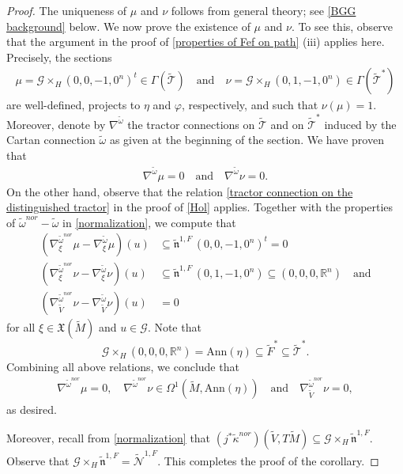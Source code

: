\documentclass[11pt]{amsart}
\begin{document}
\begin{proof}
The uniqueness of $\mu$ and $\nu$ follows from general theory; see \cref{BGG background} below. We now prove the existence of $\mu$ and $\nu$. To see this, observe that the argument in the proof of \cref{properties of Fef on path} (iii) applies here. Precisely, the sections 
\begin{align*}
\mu=\mathcal G\times_H(0,0,-1,0^n)^t\in\Gamma(\tilde{\mathcal T})
\quad\text{and}\quad
\nu=\mathcal G\times_H(0,1,-1,0^n)\in\Gamma(\tilde{\mathcal T}^*)
\end{align*}
are well-defined, projects to $\eta$ and $\varphi$, respectively, and such that $\nu(\mu)=1$. Moreover, denote by $\nabla^{\tilde\omega}$ the tractor connections on $\tilde{\mathcal T}$ and on $\tilde{\mathcal T}^*$ induced by the Cartan connection $\tilde\omega$ as given at the beginning of the section. We have proven that
\begin{align*}
\nabla^{\tilde\omega}\mu=0
\quad\text{and}\quad
\nabla^{\tilde\omega}\nu=0.
\end{align*}
On the other hand, observe that the relation \eqref{tractor connection on the distinguished tractor} in the proof of \cref{Hol} applies. Together with the properties of $\tilde\omega^{nor}-\tilde\omega$ in \cref{normalization}, we compute that
\begin{equation*}
    \begin{aligned}
(\nabla^{\tilde\omega^{nor}}_\xi\mu-\nabla^{\tilde\omega}_\xi\mu)(u)&\subseteq
\tilde{\mathfrak n}^{1,F}\,(0,0,-1,0^n)^t=0\\
(\nabla^{\tilde\omega^{nor}}_\xi\nu-\nabla^{\tilde\omega}_\xi\nu)(u)&\subseteq
\tilde{\mathfrak n}^{1,F}\,(0,1,-1,0^n)\subseteq(0,0,0,\mathbb R^n)\quad\text{and}\\
(\nabla^{\tilde\omega^{nor}}_{\tilde V}\nu-
\nabla^{\tilde\omega}_{\tilde V}\nu)(u)&=0           
    \end{aligned}
\end{equation*}
for all $\xi\in\mathfrak X(\tilde M)$ and $u\in\mathcal G$. Note that
\[\mathcal G\times_H(0,0,0,\mathbb R^n)=\mathrm{Ann}(\eta)\subseteq \tilde F^*\subseteq \tilde{\mathcal T}^*.\]
Combining all above relations, we conclude that 
\begin{align*}
\nabla^{\tilde\omega^{nor}}\mu=0,\quad
\nabla^{\tilde\omega^{nor}}\nu\in\Omega^1(\tilde M,\mathrm{Ann}(\eta))
\quad\text{and}\quad
\nabla^{\tilde\omega^{nor}}_{\tilde V}\nu=0,
\end{align*}
as desired.

Moreover, recall from \cref{normalization} that $(j^*\tilde\kappa^{nor})(\tilde V,T\tilde M)\subseteq\mathcal G\times_H\tilde{\mathfrak n}^{1,F}$. Observe that $\mathcal G\times_H\tilde{\mathfrak n}^{1,F}=\tilde{\mathcal N}^{1,F}$. This completes the proof of the corollary.
\end{proof}
\end{document}
